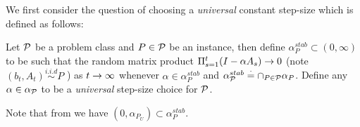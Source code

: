 \begin{comment}
The proof follows by  transforming any $A_P$ into a diagonal matrix, and looking at $1$-dimensional case. \Cref{th:pspd}-$(i)$: the $\frac{1}{(t+1)^2}$ in the denominator of $\EE{\norm{\eh_t}^2}$ is directly a result of iterate averaging,  further, when $t$ is small enough such that the forgetting factor is very close to unity, in which case no forgetting happens, and error accumulates due to the summation of the iterates leading to the $\B(t+1)^2$ and $\alpha^2 \sigma_b^2 O(t^3)$ terms. \Cref{th:pspd}-$(ii)$ is same as the previous except that, now the error is also measured with respect to $A_P$ as result we can achieve a rate of $O(\frac{1}{\sqrt{t}})$ if we choose $\alpha=\frac{1}{\sqrt{t}}$. \Cref{th:pspd}-$(iii)$ is when the noise also scales with $A_P$, and a rate of $O(\frac{1}{t})$ for any fixed $\alpha\in(0,1)$. Note that \Cref{th:pspd}-$iii$ has special structure, i.e., the noise is \emph{scaled} and the mean squared error is measured with respect to the quadratic norm induced by $A_P$, and these result in a uniform finite time rate of $\frac{1}{t}$. We would like to mention that the results of \citet{bach} is very similar to case $(iii)$. Further, it is clear that these special structures are not present in the case of TD algorithms for APE problems.
The next result shows that universal step-sizes need to exist always.
\begin{proposition}\label{prop:unistep}
There does not exist $\alpha$ such that $\Lambda(I-\alpha A_P)<1, \forall P\in \P_{det}$. 
\end{proposition}
In the case of $\P_{det}$,  $\Lambda(I-\alpha A_P)=(1-\alpha u)^2+v^2$ and as $u\ra 0$ the step-size $\alpha\ra 0$ and hence $\alpha_P$ is an empty-set.
\end{comment}

We first consider the question of choosing a \emph{universal} constant step-size which is defined as follows:
\begin{definition} Let $\P$ be a problem class and $P\in\P$ be an instance, then define $\alpha^{stab}_{P}\subset (0,\infty)$ to be such that the random matrix product $\Pi_{s=1}^t (I-\alpha A_s)\ra 0$ (note $(b_t,A_t)\overset{i.i.d}{\sim} P$ ) as $t\ra\infty$ whenever $\alpha\in \alpha^{stab}_P$ and $\alpha^{stab}_{\P}\eqdef\cap_{P\in \P}\alpha_{P}$. Define any $\alpha\in\alpha_{\P}$ to be a \emph{universal} step-size choice for $\P$.
\end{definition}
Note that from  we have $(0,\alpha_{P_U})\subset \alpha^{stab}_{P}$. 

